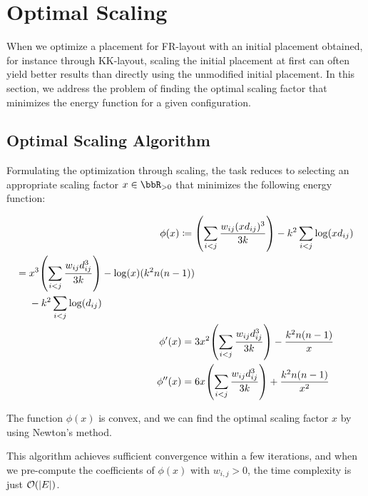 \documentclass[dvipdfmx,journal]{IEEEtran}
\newcommand{\defeq}{\coloneqq}
\begin{document}

\appendices

\section{Optimal Scaling}\label{sec:scaling}

When we optimize a placement for FR-layout with an initial placement obtained, for instance through KK-layout, scaling the initial placement at first can often yield better results than directly using the unmodified initial placement.
In this section, we address the problem of finding the optimal scaling factor that minimizes the energy function for a given configuration.

\subsection{Optimal Scaling Algorithm}\label{ssec:scalingAlgorithm}

Formulating the optimization through scaling, the task reduces to selecting an appropriate scaling factor $x \in \bbR_{> 0}$ that minimizes the following energy function:

\begin{align*}
  \phi(x) \defeq {} & \qty(\sum_{i < j} \frac{w_{ij} (xd_{ij})^3}{3k}) - k^2 \sum_{i < j} \log(x d_{ij})                                    \\
  \begin{split}
    = {} & x^3 \qty(\sum_{i < j} \frac{w_{ij} d_{ij}^3}{3k}) - \log(x)(k^2 n(n-1))\\
    & - k^2 \sum_{i < j} \log(d_{ij})
  \end{split} \\
  \phi'(x) = {}     & 3x^2 \qty(\sum_{i < j} \frac{w_{ij} d_{ij}^3}{3k}) - \frac{k^2 n(n-1)}{x}                                             \\
  \phi''(x) = {}    & 6x \qty(\sum_{i < j} \frac{w_{ij} d_{ij}^3}{3k}) + \frac{k^2 n(n-1)}{x^2}
\end{align*}

The function $\phi(x)$ is convex, and we can find the optimal scaling factor $x$ by using Newton's method.

This algorithm achieves sufficient convergence within a few iterations, and when we pre-compute the coefficients of $\phi(x)$ with $w_{i,j} > 0$, the time complexity is just $\order{\abs{E}}$.
\end{document}
